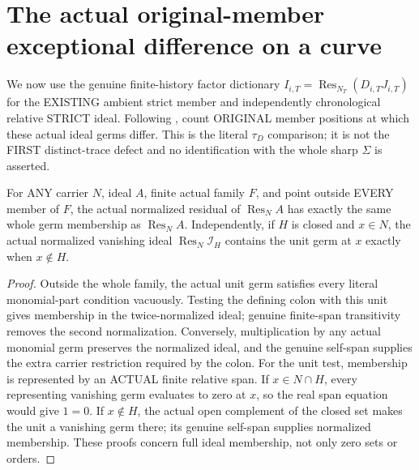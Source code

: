 \section{The actual original-member exceptional difference on a curve}

We now use the genuine finite-history factor dictionary
$I_{i,T}=\operatorname{Res}_{N_T}(D_{i,T}J_{i,T})$ for the EXISTING
ambient strict member and independently chronological relative STRICT ideal.
Following \cite[Lemma~12.8, p.~295]{bierstone-milman97-invent-math}, count
ORIGINAL member positions at which these actual ideal germs differ. This
is the literal $\tau_D$ comparison; it is not the FIRST distinct-trace
defect and no identification with the whole sharp $\Sigma$ is asserted.

\begin{lemma}
\label{hir:sharp-actual-normalized-residual-off-family-and-unit-test}
\leanok
For ANY carrier $N$, ideal $A$, finite actual family $F$, and point outside
EVERY member of $F$, the actual normalized residual of
$\operatorname{Res}_N A$ has exactly the same whole germ membership as
$\operatorname{Res}_N A$. Independently, if $H$ is closed and $x\in N$,
the actual normalized vanishing ideal $\operatorname{Res}_N\mathcal I_H$
contains the unit germ at $x$ exactly when $x\notin H$.
\end{lemma}
\begin{proof}
Outside the whole family, the actual unit germ satisfies every literal
monomial-part condition vacuously. Testing the defining colon with this
unit gives membership in the twice-normalized ideal; genuine finite-span
transitivity removes the second normalization. Conversely, multiplication
by any actual monomial germ preserves the normalized ideal, and the genuine
self-span supplies the extra carrier restriction required by the colon.
For the unit test, membership is represented by an ACTUAL finite relative
span. If $x\in N\cap H$, every representing vanishing germ evaluates to
zero at $x$, so the real span equation would give $1=0$. If $x\notin H$,
the actual open complement of the closed set makes the unit a vanishing
germ there; its genuine self-span supplies normalized membership. These
proofs concern full ideal membership, not only zero sets or orders.
\end{proof}

